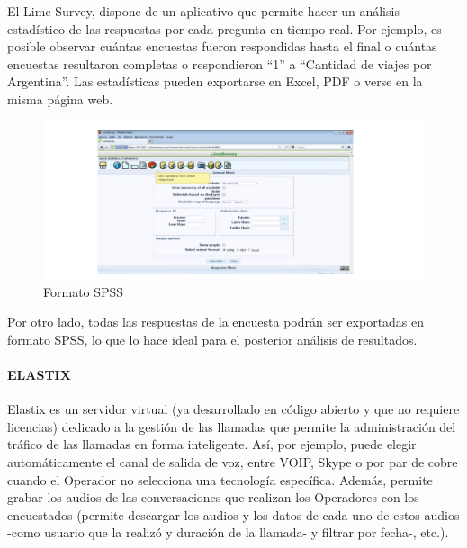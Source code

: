 \documentclass[
  openany]{book}
\begin{document}
El Lime Survey, dispone de un aplicativo que permite hacer un análisis estadístico de las respuestas por cada pregunta en tiempo real. Por ejemplo, es posible observar cuántas encuestas fueron respondidas hasta el final o cuántas encuestas resultaron completas o respondieron ``1'' a ``Cantidad de viajes por Argentina''. Las estadísticas pueden exportarse en Excel, PDF o verse en la misma página web.

\begin{figure}

{\centering \includegraphics[width=1\linewidth]{imagenes/figura6-11} 

}

\caption{Formato SPSS}\label{fig:SPSS}
\end{figure}

Por otro lado, todas las respuestas de la encuesta podrán ser exportadas en formato SPSS, lo que lo hace ideal para el posterior análisis de resultados.

\hypertarget{elastix}{%
\paragraph{ELASTIX}\label{elastix}}

Elastix es un servidor virtual (ya desarrollado en código abierto y que no requiere licencias) dedicado a la gestión de las llamadas que permite la administración del tráfico de las llamadas en forma inteligente. Así, por ejemplo, puede elegir automáticamente el canal de salida de voz, entre VOIP, Skype o por par de cobre cuando el Operador no selecciona una tecnología específica. Además, permite grabar los audios de las conversaciones que realizan los Operadores con los encuestados (permite descargar los audios y los datos de cada uno de estos audios -como usuario que la realizó y duración de la llamada- y filtrar por fecha-, etc.).
\end{document}
